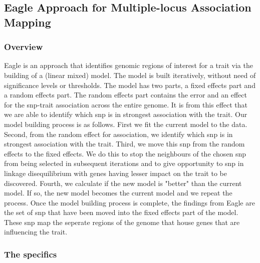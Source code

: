 \documentclass{nature}
\begin{document}
\subsection{Eagle Approach for Multiple-locus Association Mapping}
\subsubsection{Overview}


Eagle is an approach that identifies genomic regions of interest for a trait via the building of a (linear mixed) model. The model is built iteratively, without need of significance levels or thresholds. The model has two parts, a fixed effects part and a random effects part. The random effects part contains the error and an effect for the snp-trait association across the entire genome. It is from this effect 
 that we are able to identify which snp is in strongest association with the trait.  
 Our model building process is as follows. First we fit the current model to the data. Second, from the random effect for association, we identify which snp is in strongest association  with the trait.  Third, we move this snp from the random effects to the fixed effects.
We do this to stop the neighbours of the chosen snp from being selected in subsequent iterations and 
to give opportunity to snp in linkage disequilibrium with genes having lesser impact on the trait to be discovered. 
 Fourth, we calculate if the new model is "better" than the current model. 
If so,  the new model becomes the current model and we repeat the process.   Once the model building process is complete, the findings from Eagle are the set of snp that have been moved into the fixed effects part of the model.  These snp map the seperate regions of the genome that house genes that are influencing the trait.  
 
 
 
 

\subsubsection{The specifics}

\end{document}
